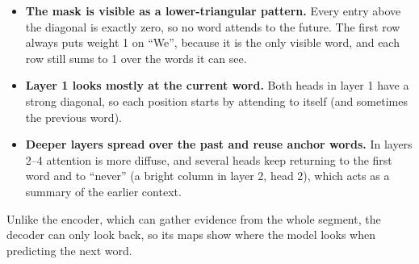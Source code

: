 \documentclass[10pt]{article}
\begin{document}
\begin{itemize}
  \item \textbf{The mask is visible as a lower-triangular pattern.} Every entry above the diagonal is exactly zero,
        so no word attends to the future. The first row always puts weight 1 on ``We'', because it is the only
        visible word, and each row still sums to 1 over the words it can see.
  \item \textbf{Layer 1 looks mostly at the current word.} Both heads in layer 1 have a strong diagonal, so each
        position starts by attending to itself (and sometimes the previous word).
  \item \textbf{Deeper layers spread over the past and reuse anchor words.} In layers 2--4 attention is more
        diffuse, and several heads keep returning to the first word and to ``never'' (a bright column in layer 2,
        head 2), which acts as a summary of the earlier context.
\end{itemize}
Unlike the encoder, which can gather evidence from the whole segment, the decoder can only look back, so its maps
show where the model looks when predicting the next word.


\end{document}
